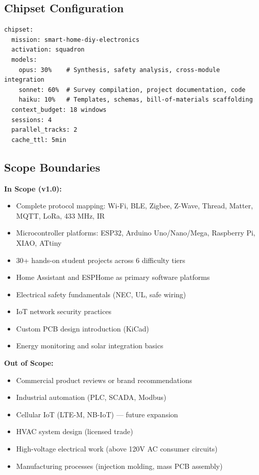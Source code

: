 \documentclass[11pt,letterpaper]{article}
\begin{document}
\subsection{Chipset Configuration}

\begin{asciibox}
\begin{verbatim}
chipset:
  mission: smart-home-diy-electronics
  activation: squadron
  models:
    opus: 30%    # Synthesis, safety analysis, cross-module integration
    sonnet: 60%  # Survey compilation, project documentation, code
    haiku: 10%   # Templates, schemas, bill-of-materials scaffolding
  context_budget: 18 windows
  sessions: 4
  parallel_tracks: 2
  cache_ttl: 5min
\end{verbatim}
\end{asciibox}

\subsection{Scope Boundaries}

\textbf{In Scope (v1.0):}
\begin{itemize}[leftmargin=2em]
  \item Complete protocol mapping: Wi-Fi, BLE, Zigbee, Z-Wave, Thread, Matter, MQTT, LoRa, 433 MHz, IR
  \item Microcontroller platforms: ESP32, Arduino Uno/Nano/Mega, Raspberry Pi, XIAO, ATtiny
  \item 30+ hands-on student projects across 6 difficulty tiers
  \item Home Assistant and ESPHome as primary software platforms
  \item Electrical safety fundamentals (NEC, UL, safe wiring)
  \item IoT network security practices
  \item Custom PCB design introduction (KiCad)
  \item Energy monitoring and solar integration basics
\end{itemize}

\textbf{Out of Scope:}
\begin{itemize}[leftmargin=2em]
  \item Commercial product reviews or brand recommendations
  \item Industrial automation (PLC, SCADA, Modbus)
  \item Cellular IoT (LTE-M, NB-IoT) --- future expansion
  \item HVAC system design (licensed trade)
  \item High-voltage electrical work (above 120V AC consumer circuits)
  \item Manufacturing processes (injection molding, mass PCB assembly)
\end{itemize}
\end{document}
